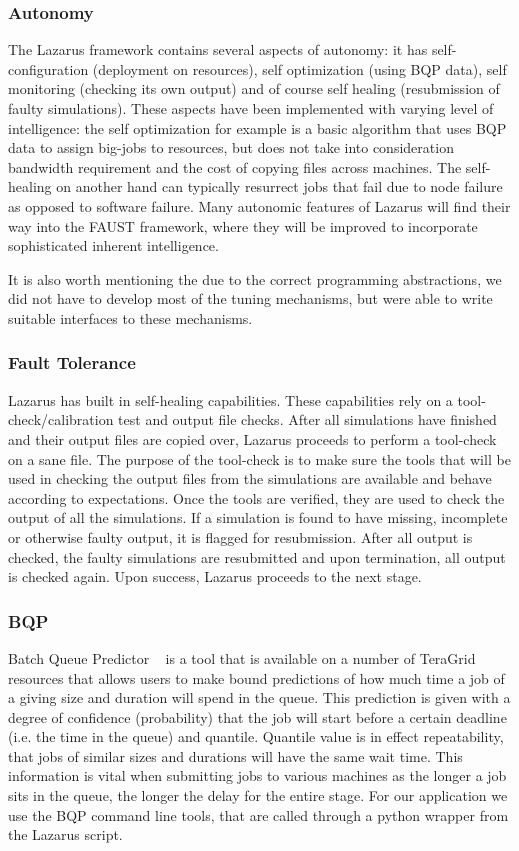 \documentclass[conference,final]{IEEEtran}
\begin{document}
\subsubsection{Autonomy}
The Lazarus framework contains several aspects of autonomy: it has
self-configuration (deployment on resources), self optimization (using
BQP data), self monitoring (checking its own output) and of course
self healing (resubmission of faulty simulations). These aspects have
been implemented with varying level of intelligence: the self
optimization for example is a basic algorithm that uses BQP data to
assign big-jobs to resources, but does not take into consideration
bandwidth requirement and the cost of copying files across
machines. The self-healing on another hand can typically resurrect
jobs that fail due to node failure as opposed to software
failure. Many autonomic features of Lazarus will find their way into
the FAUST framework, where they will be improved to incorporate
sophisticated inherent intelligence.  

It is also worth mentioning the due to the correct programming
abstractions, we did not have to develop most of the tuning
mechanisms, but were able to write suitable interfaces to these
mechanisms.

\subsubsection{Fault Tolerance}
Lazarus has built in self-healing capabilities. These capabilities
rely on a tool-check/calibration test and output file checks. After
all simulations have finished and their output files are copied over,
Lazarus proceeds to perform a tool-check on a sane file. The purpose
of the tool-check is to make sure the tools that will be used in
checking the output files from the simulations are available and
behave according to expectations. Once the tools are verified, they
are used to check the output of all the simulations. If a simulation
is found to have missing, incomplete or otherwise faulty output, it is
flagged for resubmission.  After all output is checked, the faulty
simulations are resubmitted and upon termination, all output is
checked again. Upon success, Lazarus proceeds to the next stage.

\subsubsection{BQP}
Batch Queue Predictor ~\cite{bqp} is a tool that is available on a
number of TeraGrid resources that allows users to make bound
predictions of how much time a job of a giving size and duration will
spend in the queue.  This prediction is given with a degree of
confidence (probability) that the job will start before a certain
deadline (i.e. the time in the queue) and quantile. Quantile value is
in effect repeatability, that jobs of similar sizes and durations will
have the same wait time. This information is vital when
submitting jobs to various machines as the longer a job sits in the
queue, the longer the delay for the entire stage.  For our application
we use the BQP command line tools, that are called through a python wrapper
from the Lazarus script.
\end{document}
